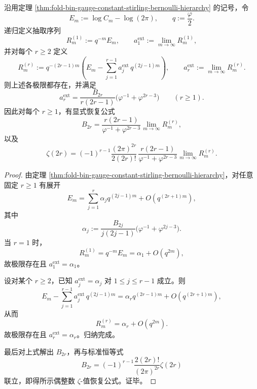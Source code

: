 \begin{theorem}\label{thm:xi-foldbin-gauge-constant-recursive-bernoulli-zeta-recovery}
沿用定理 \ref{thm:fold-bin-gauge-constant-stirling-bernoulli-hierarchy} 的记号，令
\[
E_m:=\log C_m-\log(2\pi),
\qquad
q:=\frac{\varphi}{2}.
\]
递归定义抽取序列
\[
R_m^{(1)}:=q^{-m}E_m,
\qquad
a_1^{\mathrm{ext}}:=\lim_{m\to\infty}R_m^{(1)},
\]
并对每个 \(r\ge 2\) 定义
\[
R_m^{(r)}
:=
q^{-(2r-1)m}
\left(
E_m-\sum_{j=1}^{r-1}a_j^{\mathrm{ext}}\,q^{(2j-1)m}
\right),
\qquad
a_r^{\mathrm{ext}}:=\lim_{m\to\infty}R_m^{(r)}.
\]
则上述各极限都存在，并满足
\[
a_r^{\mathrm{ext}}
=
\frac{B_{2r}}{r(2r-1)}\bigl(\varphi^{-1}+\varphi^{2r-3}\bigr)
\qquad(r\ge 1).
\]
因此对每个 \(r\ge 1\)，有显式恢复公式
\[
B_{2r}
=
\frac{r(2r-1)}{\varphi^{-1}+\varphi^{2r-3}}
\lim_{m\to\infty}R_m^{(r)},
\]
以及
\[
\zeta(2r)
=
(-1)^{r-1}\frac{(2\pi)^{2r}}{2(2r)!}\,
\frac{r(2r-1)}{\varphi^{-1}+\varphi^{2r-3}}
\lim_{m\to\infty}R_m^{(r)}.
\]
\end{theorem}
\begin{proof}
由定理 \ref{thm:fold-bin-gauge-constant-stirling-bernoulli-hierarchy}，对任意固定 \(r\ge 1\) 有展开
\[
E_m
=
\sum_{j=1}^{r}\alpha_j q^{(2j-1)m}+O(q^{(2r+1)m}),
\]
其中
\[
\alpha_j
:=
\frac{B_{2j}}{j(2j-1)}\bigl(\varphi^{-1}+\varphi^{2j-3}\bigr).
\]
当 \(r=1\) 时，
\[
R_m^{(1)}=q^{-m}E_m=\alpha_1+O(q^{2m}),
\]
故极限存在且 \(a_1^{\mathrm{ext}}=\alpha_1\)。

设对某个 \(r\ge 2\)，已知 \(a_j^{\mathrm{ext}}=\alpha_j\) 对 \(1\le j\le r-1\) 成立。则
\[
E_m-\sum_{j=1}^{r-1}a_j^{\mathrm{ext}}\,q^{(2j-1)m}
=
\alpha_r q^{(2r-1)m}+O(q^{(2r+1)m}),
\]
从而
\[
R_m^{(r)}
=
\alpha_r+O(q^{2m}).
\]
故极限存在且 \(a_r^{\mathrm{ext}}=\alpha_r\)。归纳完成。

最后对上式解出 \(B_{2r}\)，再与标准恒等式
\[
B_{2r}=(-1)^{r-1}\frac{2(2r)!}{(2\pi)^{2r}}\zeta(2r)
\]
联立，即得所示偶整数 \(\zeta\)-值恢复公式。证毕。
\end{proof}

